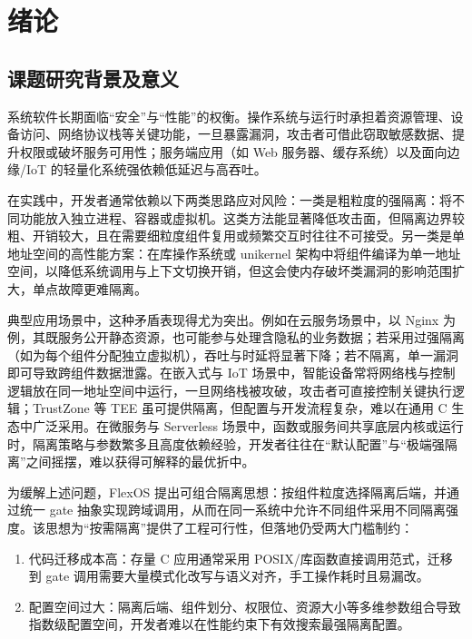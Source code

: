 \documentclass[UTF8,a4paper,12pt,twoside]{ctexart}  %
\begin{document}
\section{绪论}

\subsection{课题研究背景及意义}

系统软件长期面临``安全''与``性能''的权衡。操作系统与运行时承担着资源管理、设备访问、网络协议栈等关键功能，一旦暴露漏洞，攻击者可借此窃取敏感数据、提升权限或破坏服务可用性；服务端应用（如
Web 服务器、缓存系统）以及面向边缘/IoT
的轻量化系统强依赖低延迟与高吞吐。

在实践中，开发者通常依赖以下两类思路应对风险：一类是粗粒度的强隔离：将不同功能放入独立进程、容器或虚拟机。这类方法能显著降低攻击面，但隔离边界较粗、开销较大，且在需要细粒度组件复用或频繁交互时往往不可接受。另一类是单地址空间的高性能方案：在库操作系统或
unikernel
架构中将组件编译为单一地址空间，以降低系统调用与上下文切换开销，但这会使内存破坏类漏洞的影响范围扩大，单点故障更难隔离。

典型应用场景中，这种矛盾表现得尤为突出。例如在云服务场景中，以 Nginx
为例\cite{15}，其既服务公开静态资源，也可能参与处理含隐私的业务数据；若采用过强隔离（如为每个组件分配独立虚拟机），吞吐与时延将显著下降；若不隔离，单一漏洞即可导致跨组件数据泄露。在嵌入式与
IoT
场景中，智能设备常将网络栈与控制逻辑放在同一地址空间中运行，一旦网络栈被攻破，攻击者可直接控制关键执行逻辑；TrustZone 等 TEE 虽可提供隔离，但配置与开发流程复杂，难以在通用 C
生态中广泛采用。在微服务与 Serverless
场景中，函数或服务间共享底层内核或运行时，隔离策略与参数繁多且高度依赖经验，开发者往往在``默认配置''与``极端强隔离''之间摇摆，难以获得可解释的最优折中。

为缓解上述问题，FlexOS
提出可组合隔离思想\cite{1,2}：按组件粒度选择隔离后端，并通过统一
gate
抽象实现跨域调用，从而在同一系统中允许不同组件采用不同隔离强度。该思想为``按需隔离''提供了工程可行性，但落地仍受两大门槛制约：
\begin{enumerate}
  \def\labelenumi{\arabic{enumi}.}
  \item
        代码迁移成本高：存量 C 应用通常采用
        POSIX/库函数直接调用范式，迁移到 gate
        调用需要大量模式化改写与语义对齐，手工操作耗时且易漏改。
  \item
        配置空间过大：隔离后端、组件划分、权限位、资源大小等多维参数组合导致指数级配置空间，开发者难以在性能约束下有效搜索最强隔离配置。
\end{enumerate}
\end{document}
